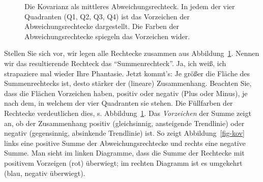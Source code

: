 \documentclass[
  letterpaper,
  twoside,
  open=any]{scrbook}
\theoremstyle{definition}
\theoremstyle{definition}
\theoremstyle{definition}
\theoremstyle{remark}
\begin{document}
\begin{figure}


\caption{\label{fig-delta-rect}Die Kovarianz als mittleres
Abweichungsrechteck. In jedem der vier Quadranten (Q1, Q2, Q3, Q4) ist
das Vorzeichen der Abweichungsrechtecke dargestellt. Die Farben der
Abweichungsrechtecke spiegeln das Vorzeichen wider.}

\end{figure}%

Stellen Sie sich vor, wir legen alle Rechtecke zusammen aus
Abbildung~\ref{fig-delta-rect}. Nennen wir das resultierende Rechteck
das \enquote{Summenrechteck}. Ja, ich weiß, ich strapaziere mal wieder
Ihre Phantasie. Jetzt kommt's: Je größer die Fläche des Summenrechtecks
ist, desto stärker der (lineare) Zusammenhang. Beachten Sie, dass die
Flächen Vorzeichen haben, positiv oder negativ (Plus oder Minus), je
nach dem, in welchem der vier Quadranten sie stehen. Die Füllfarben der
Rechtecke verdeutlichen dies, s. Abbildung~\ref{fig-delta-rect}. Das
\emph{Vorzeichen} der Summe zeigt an, ob der Zusammenhang positiv
(gleichsinnig, ansteigende Trendlinie) oder negativ (gegensinnig,
absinkende Trendlinie) ist. So zeigt Abbildung~\ref{fig-kov} links eine
positive Summe der Abweichungsrechtecke und rechts eine negative Summe.
Man sieht im linken Diagramme, dass die Summe der Rechtecke mit
positivem Vorzeigen (rot) überwiegt; im rechten Diagramm ist es
umgekehrt (blau, negativ überwiegt).
\end{document}
